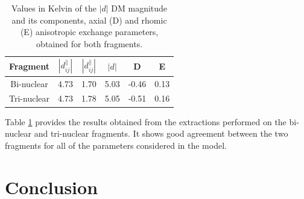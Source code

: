\documentclass[12pt]{report}
\numberwithin{equation}{section}
\begin{document}
\begin{table}[!ht]
    \centering
    \begin{tabular}{ c c c c c c }
        \hline
        Fragment & $|d_{ij}^{\parallel}|$ & $|d_{ij}^{\parallel}|$ & $|d|$ & D & E\\
        \hline
        Bi-nuclear & 4.73  & 1.70 &  5.03 & -0.46 & 0.13 \\
        Tri-nuclear & 4.73 & 1.78 &  5.05 & -0.51 & 0.16\\
        \hline 
    \end{tabular}
    \caption{Values in Kelvin of the $|d|$ DM magnitude and its components, axial (D) and rhomic (E) anisotropic exchange parameters, obtained for both fragments.}
    \label{tab:ResumeDMI}
\end{table}

Table \ref{tab:ResumeDMI} provides the results obtained from the extractions performed on the bi-nuclear and tri-nuclear fragments. 
It shows good agreement between the two fragments for all of the parameters considered in the model.

\section{Conclusion}
\end{document}
